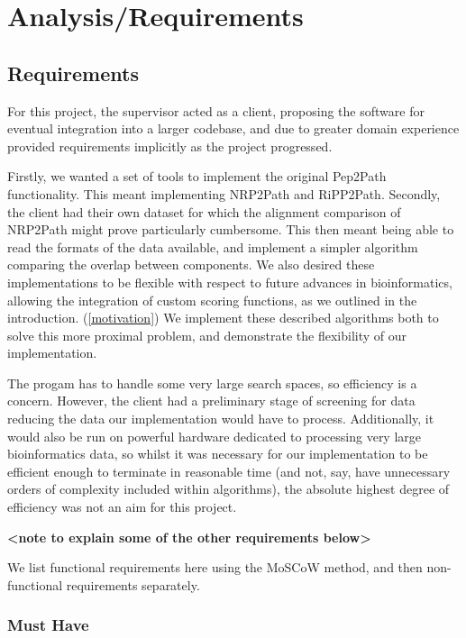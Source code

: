 \documentclass{l4proj}
\begin{document}
\chapter{Analysis/Requirements}

\section{Requirements}

For this project, the supervisor acted as a client, proposing the software for eventual integration into a larger codebase, and due to greater domain experience provided requirements implicitly as the project progressed. 

Firstly, we wanted a set of tools to implement the original Pep2Path functionality. This meant implementing NRP2Path and RiPP2Path. Secondly, the client had their own dataset for which the alignment comparison of NRP2Path might prove particularly cumbersome. This then meant being able to read the formats of the data available, and implement a simpler algorithm comparing the overlap between components. We also desired these implementations to be flexible with respect to future advances in bioinformatics, allowing the integration of custom scoring functions, as we outlined in the introduction. (\ref{motivation}) We implement these described algorithms both to solve this more proximal problem, and demonstrate the flexibility of our implementation.

The progam has to handle some very large search spaces, so efficiency is a concern. However, the client had a preliminary stage of screening for data reducing the data our implementation would have to process. Additionally, it would also be run on powerful hardware dedicated to processing very large bioinformatics data, so whilst it was necessary for our implementation to be efficient enough to terminate in reasonable time (and not, say, have unnecessary orders of complexity included within algorithms), the absolute highest degree of efficiency was not an aim for this project.

\textbf{<note to explain some of the other requirements below>}

We list functional requirements here using the MoSCoW method, and then non-functional requirements separately.

\subsection{Must Have}
\end{document}
